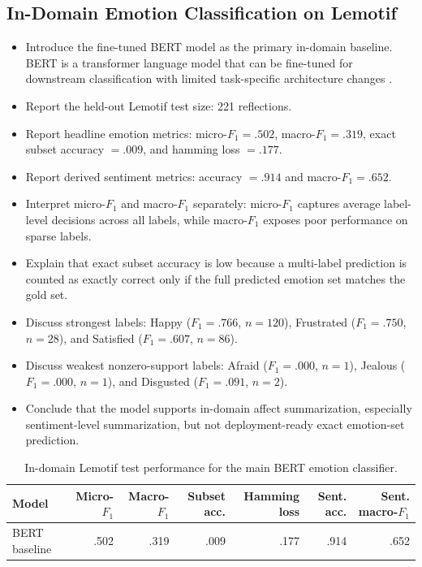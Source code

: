 
\subsection{In-Domain Emotion Classification on Lemotif}
\label{subs:in-domain-emotion-classification}

\begin{itemize}
    \item Introduce the fine-tuned BERT model as the primary in-domain baseline. BERT is a transformer language model that can be fine-tuned for downstream classification with limited task-specific architecture changes \parencite{vaswani2017attention,devlin2019bert}.
    \item Report the held-out Lemotif test size: 221 reflections.
    \item Report headline emotion metrics: micro-$F_1 = .502$, macro-$F_1 = .319$, exact subset accuracy $= .009$, and hamming loss $= .177$.
    \item Report derived sentiment metrics: accuracy $= .914$ and macro-$F_1 = .652$.
    \item Interpret micro-$F_1$ and macro-$F_1$ separately: micro-$F_1$ captures average label-level decisions across all labels, while macro-$F_1$ exposes poor performance on sparse labels.
    \item Explain that exact subset accuracy is low because a multi-label prediction is counted as exactly correct only if the full predicted emotion set matches the gold set.
    \item Discuss strongest labels: Happy ($F_1 = .766$, $n = 120$), Frustrated ($F_1 = .750$, $n = 28$), and Satisfied ($F_1 = .607$, $n = 86$).
    \item Discuss weakest nonzero-support labels: Afraid ($F_1 = .000$, $n = 1$), Jealous ($F_1 = .000$, $n = 1$), and Disgusted ($F_1 = .091$, $n = 2$).
    \item Conclude that the model supports in-domain affect summarization, especially sentiment-level summarization, but not deployment-ready exact emotion-set prediction.
\end{itemize}

\begin{table}[htbp]
    \centering
    \caption{In-domain Lemotif test performance for the main BERT emotion classifier.}
    \label{tab:lemotif-bert-main}
    \begin{tabular}{lrrrrrr}
        \toprule
        Model & Micro-$F_1$ & Macro-$F_1$ & Subset acc. & Hamming loss & Sent. acc. & Sent. macro-$F_1$ \\
        \midrule
        BERT baseline & .502 & .319 & .009 & .177 & .914 & .652 \\
        \bottomrule
    \end{tabular}
\end{table}

